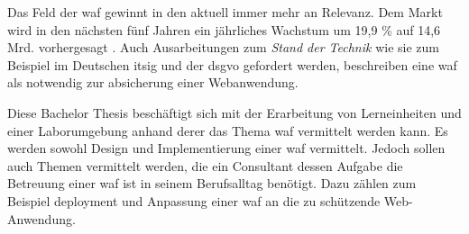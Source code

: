 \label{chap:einleitung}


Das Feld der \ac{waf} gewinnt in den aktuell immer mehr an Relevanz.
Dem Markt wird in den nächsten fünf Jahren ein jährliches Wachstum um 19,9 \% auf 14,6 Mrd. vorhergesagt \cite{WebApplicationFirewall}.
Auch Ausarbeitungen zum \textit{Stand der Technik} wie sie zum Beispiel im Deutschen \ac{itsig} und der \ac{dsgvo} gefordert werden, beschreiben eine \ac{waf} als notwendig zur absicherung einer Webanwendung\cite[3.1.19 Schutz von Webanwendungen]{StandTechnik}.


Diese Bachelor Thesis beschäftigt sich mit der Erarbeitung von Lerneinheiten und einer Laborumgebung anhand derer das Thema \ac{waf} vermittelt werden kann.
Es werden sowohl Design und Implementierung einer \ac{waf} vermittelt. Jedoch sollen auch Themen vermittelt werden, die ein Consultant dessen Aufgabe die Betreuung einer \ac{waf} ist in seinem Berufsalltag benötigt. Dazu zählen zum Beispiel deployment und Anpassung einer \ac{waf} an die zu schützende Web-Anwendung.


\pagebreak
